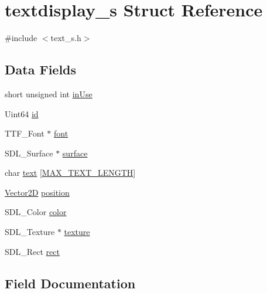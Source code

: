 \hypertarget{structtextdisplay__s}{}\section{textdisplay\+\_\+s Struct Reference}
\label{structtextdisplay__s}


{\ttfamily \#include $<$text\+\_\+s.\+h$>$}

\subsection*{Data Fields}
\begin{DoxyCompactItemize}
\item 
short unsigned int \hyperlink{structtextdisplay__s_a13159f6b47122dc47eb11b1653a1663a}{in\+Use}
\item 
Uint64 \hyperlink{structtextdisplay__s_a4158e9a3af9337e59f9b8de984c0efba}{id}
\item 
T\+T\+F\+\_\+\+Font $\ast$ \hyperlink{structtextdisplay__s_abf5bfa705e66ffc1ddaa6ce46c960873}{font}
\item 
S\+D\+L\+\_\+\+Surface $\ast$ \hyperlink{structtextdisplay__s_a2f5cac12e913bcfcff660305bf88dd3b}{surface}
\item 
char \hyperlink{structtextdisplay__s_a4746722d9d13b9cdc8b2146221816d54}{text} \mbox{[}\hyperlink{text__s_8h_a9a90baeac9b3273d185357200b599b39}{M\+A\+X\+\_\+\+T\+E\+X\+T\+\_\+\+L\+E\+N\+G\+TH}\mbox{]}
\item 
\hyperlink{struct_vector2_d}{Vector2D} \hyperlink{structtextdisplay__s_a2dc349a13930beaf26472e0d04d9563e}{position}
\item 
S\+D\+L\+\_\+\+Color \hyperlink{structtextdisplay__s_a631bf4babe4c1825a2cdc0c19c2bd04f}{color}
\item 
S\+D\+L\+\_\+\+Texture $\ast$ \hyperlink{structtextdisplay__s_a859b8efbf9abe8e82757ee5c75a0c97c}{texture}
\item 
S\+D\+L\+\_\+\+Rect \hyperlink{structtextdisplay__s_a55aefd071649ac9dd8133e2d8a52d11f}{rect}
\end{DoxyCompactItemize}


\subsection{Field Documentation}
\mbox{\label{structtextdisplay__s_a631bf4babe4c1825a2cdc0c19c2bd04f}} 
